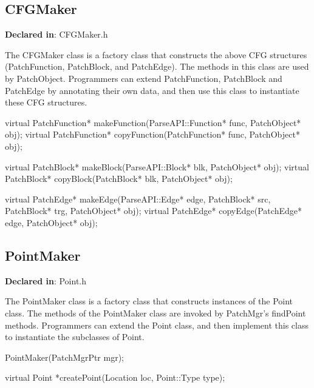 \subsection{CFGMaker}
\label{sec-3.2.12}

\textbf{Declared in}: CFGMaker.h

The CFGMaker class is a factory class that constructs the above CFG structures
(PatchFunction, PatchBlock, and PatchEdge). The methods in this class are used
by PatchObject. Programmers can extend PatchFunction, PatchBlock and PatchEdge
by annotating their own data, and then use this class to instantiate these CFG
structures.


\begin{apient}
virtual PatchFunction* makeFunction(ParseAPI::Function* func, PatchObject* obj);
virtual PatchFunction* copyFunction(PatchFunction* func, PatchObject* obj);

virtual PatchBlock* makeBlock(ParseAPI::Block* blk, PatchObject* obj);
virtual PatchBlock* copyBlock(PatchBlock* blk, PatchObject* obj);

virtual PatchEdge* makeEdge(ParseAPI::Edge* edge, PatchBlock* src,
                            PatchBlock* trg, PatchObject* obj);
virtual PatchEdge* copyEdge(PatchEdge* edge, PatchObject* obj);
\end{apient}


\subsection{PointMaker}
\label{sec-3.2.13}

\textbf{Declared in}: Point.h

The PointMaker class is a factory class that constructs instances of the Point
class. The methods of the PointMaker class are invoked by PatchMgr's findPoint
methods. Programmers can extend the Point class, and then implement this class
to instantiate the subclasses of Point.


\begin{apient}
PointMaker(PatchMgrPtr mgr);
\end{apient}


\begin{apient}
virtual Point *createPoint(Location loc, Point::Type type);
\end{apient}

